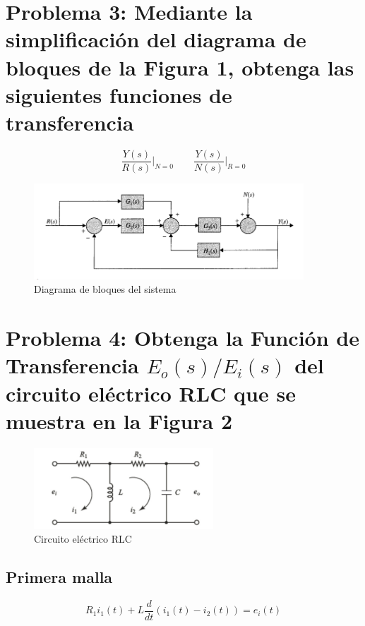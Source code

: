 \documentclass[10pt]{article}
\theoremstyle{definition}
\theoremstyle{remark}
\theoremstyle{definition}
\numberwithin{equation}{prob}
\begin{document}
\newpage

\section{Problema 3: Mediante la simplificación del diagrama de bloques de la Figura 1, obtenga las siguientes funciones de transferencia}

\[
	\frac{Y(s)}{R(s)} \bigg|_{N=0}
	\quad \quad
	\frac{Y(s)}{N(s)} \bigg|_{R=0}
\]

\begin{figure}[h]
	\centering
	\includegraphics[width=0.9\textwidth]{./figures/Figura 1 ejercicio 3.png}
	\caption{Diagrama de bloques del sistema}
\end{figure}

\section{Problema 4: Obtenga la Función de Transferencia \texorpdfstring{$E_o(s)/E_i(s)$}{Eo(s)/Ei(s)} del circuito eléctrico RLC que se muestra en la Figura 2}

\begin{figure}[h]
	\centering
	\includegraphics[width=0.6\textwidth]{./figures/Figura 2 ejercicio 4.png}
	\caption{Circuito eléctrico RLC}
\end{figure}

\subsection*{Primera malla}

\[
	R_1 i_1(t) + L \frac{d}{dt} \left( i_1(t) - i_2(t) \right) = e_i(t)
\]
\end{document}
